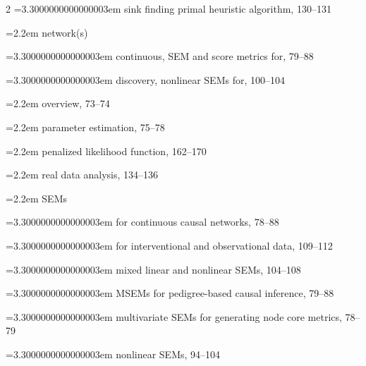\begin{multicols}{2}
\noindent\hangindent=3.3000000000000003em \hspace*{2.2em}sink finding primal heuristic algorithm, 130--131\par
\noindent\hangindent=2.2em \hspace*{1.1em}network(s)\par
\noindent\hangindent=3.3000000000000003em \hspace*{2.2em}continuous, SEM and score metrics for, 79--88\par
\noindent\hangindent=3.3000000000000003em \hspace*{2.2em}discovery, nonlinear SEMs for, 100--104\par
\noindent\hangindent=2.2em \hspace*{1.1em}overview, 73--74\par
\noindent\hangindent=2.2em \hspace*{1.1em}parameter estimation, 75--78\par
\noindent\hangindent=2.2em \hspace*{1.1em}penalized likelihood function, 162--170\par
\noindent\hangindent=2.2em \hspace*{1.1em}real data analysis, 134--136\par
\noindent\hangindent=2.2em \hspace*{1.1em}SEMs\par
\noindent\hangindent=3.3000000000000003em \hspace*{2.2em}for continuous causal networks, 78--88\par
\noindent\hangindent=3.3000000000000003em \hspace*{2.2em}for interventional and observational data, 109--112\par
\noindent\hangindent=3.3000000000000003em \hspace*{2.2em}mixed linear and nonlinear SEMs, 104--108\par
\noindent\hangindent=3.3000000000000003em \hspace*{2.2em}MSEMs for pedigree-based causal inference, 79--88\par
\noindent\hangindent=3.3000000000000003em \hspace*{2.2em}multivariate SEMs for generating node core metrics, 78--79\par
\noindent\hangindent=3.3000000000000003em \hspace*{2.2em}nonlinear SEMs, 94--104\par

\end{multicols}
